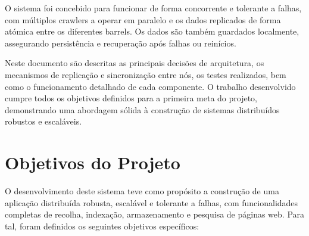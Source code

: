 \documentclass{article}
\begin{document}
O sistema foi concebido para funcionar de forma concorrente e tolerante a falhas, com múltiplos crawlers a operar em paralelo e os dados replicados de forma atómica entre os diferentes barrels. Os dados são também guardados localmente, assegurando persistência e recuperação após falhas ou reinícios.

Neste documento são descritas as principais decisões de arquitetura, os mecanismos de replicação e sincronização entre nós, os testes realizados, bem como o funcionamento detalhado de cada componente. O trabalho desenvolvido cumpre todos os objetivos definidos para a primeira meta do projeto, demonstrando uma abordagem sólida à construção de sistemas distribuídos robustos e escaláveis.


















\newpage
\section{Objetivos do Projeto}
O desenvolvimento deste sistema teve como propósito a construção de uma aplicação distribuída robusta, escalável e tolerante a falhas, com funcionalidades completas de recolha, indexação, armazenamento e pesquisa de páginas web. 
\newline Para tal, foram definidos os seguintes objetivos específicos:
\end{document}
